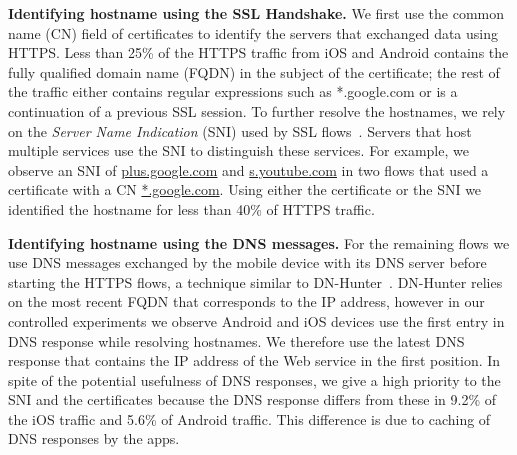 \noindent\textbf{Identifying hostname using the SSL Handshake.}
We first use the common name (CN) field of certificates to identify the servers that exchanged data using HTTPS.
Less than 25\% of the HTTPS traffic from iOS and Android contains the fully qualified domain name (FQDN) in the subject of the certificate; the rest of the traffic either contains regular expressions such as *.google.com or is a continuation of a previous SSL session. 
To further resolve the hostnames, we rely on the \emph{Server Name Indication} (SNI) used by SSL flows~\cite{rfc:servernametls}.
Servers that host multiple services use the SNI to distinguish these services.   
For example, we observe an SNI of \url{plus.google.com} and \url{s.youtube.com} in two flows that used a certificate with a CN \url{*.google.com}.
Using either the certificate or the SNI we identified the hostname for	 less than 40\% of HTTPS traffic.

\noindent\textbf{Identifying hostname using the DNS messages.} 
For the remaining flows we use DNS messages exchanged by the mobile device with its DNS server before starting the HTTPS flows, a technique similar to DN-Hunter~\cite{bermudez:dnhunter}.
DN-Hunter relies on the most recent FQDN that corresponds to the IP address, however in our controlled experiments we observe Android and iOS devices use the first entry in DNS response while resolving hostnames.
We therefore use the latest DNS response that contains the IP address of the Web service in the first position.
In spite of the potential usefulness of DNS responses, we give a high priority to the SNI and the certificates because the DNS response differs from these in 9.2\% of the iOS traffic and 5.6\% of Android traffic.
This difference is due to caching of DNS responses by the apps.

